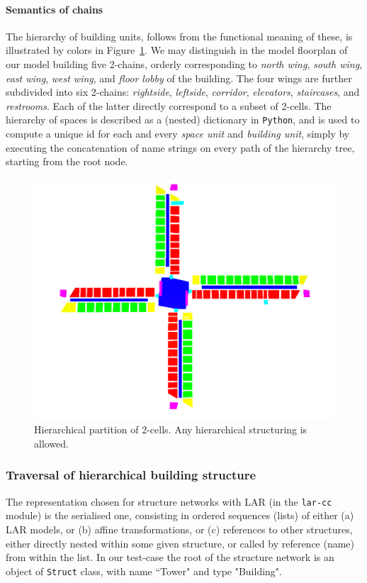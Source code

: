 \documentclass[]{egpubl}
\begin{document}
\paragraph*{Semantics of chains}

The hierarchy of building units, follows from the functional meaning of these, is illustrated by colors in Figure~\ref{fig:input-png6}. We may distinguish in the model floorplan of our model building five 2-chains, orderly corresponding to \emph{north wing}, \emph{south wing}, \emph{east wing}, \emph{west  wing}, and \emph{floor lobby} of the building. The four wings are further subdivided into six 2-chains: \emph{rightside}, \emph{leftside}, \emph{corridor}, \emph{elevators}, \emph{staircases}, and \emph{restrooms}. Each of the latter directly correspond to a subset of 2-cells. The hierarchy of spaces is described as a (nested) dictionary in \texttt{Python}, and is used to compute  a unique id for each and every \emph{space unit} and \emph{building unit}, simply by executing the concatenation of name strings on every path of the hierarchy tree, starting from the root node.

\begin{figure}[htbp] %
   \centering
   \includegraphics[width=0.7\linewidth]{images/input-colors} 
   \caption{Hierarchical partition of 2-cells. Any hierarchical structuring is allowed.}
   \label{fig:input-png6}
\end{figure}

\subsubsection*{Traversal of hierarchical building structure}

The representation chosen for structure networks with LAR (in the \texttt{lar-cc} module) is the serialised one, consisting in ordered sequences (lists) of either (a) LAR models, or (b) affine transformations, or (c) references to other structures, either directly nested within some given structure, or called by reference (name) from within the list.
In our test-case the root of the structure network is an object of \texttt{Struct} class, with name ``Tower" and type "Building". 
\end{document}
